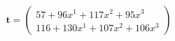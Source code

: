 \documentclass[preview]{standalone}
\begin{document}
\begin{align*}
\mathbf{t} = \begin{pmatrix}57 + 96x^{1} + 117x^{2} + 95x^{3} \\ 116 + 130x^{1} + 107x^{2} + 106x^{3}\end{pmatrix}
\end{align*}
\end{document}
